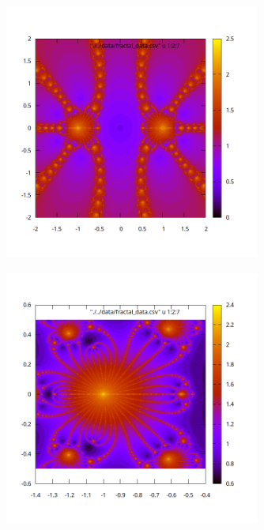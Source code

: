 \documentclass[12pt]{article}
\begin{document}
     \begin{figure}[ht]
    \centering
    \includegraphics[width=0.75\textwidth]{./../problem04/plots/fractal_plot-03_03_iter.png}
    \label{fig:03_03}
\end{figure}
     \begin{figure}[ht]
    \centering
    \includegraphics[width=0.75\textwidth]{./../problem04/plots/fractal_plot-03_04_iter.png}
    \label{fig:03_04}
\end{figure}
\end{document}
